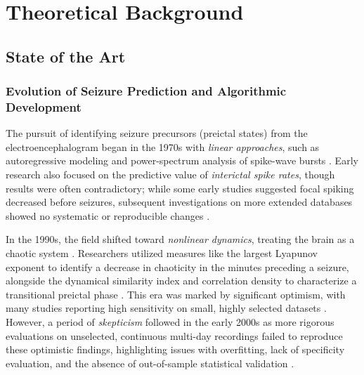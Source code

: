 \chapter{Theoretical Background}\label{ch:theoretical-background}



\section{State of the Art}


\subsection{Evolution of Seizure Prediction and Algorithmic Development}
The pursuit of identifying seizure precursors (preictal states)  from the electroencephalogram began in the 1970s with \textit{linear approaches}, such as autoregressive modeling and power-spectrum analysis of spike-wave bursts \parencite{mormann_seizure_2007}.
Early research also focused on the predictive value of \textit{interictal spike rates}, though results were often contradictory; while some early studies suggested focal spiking decreased before seizures, subsequent investigations on more extended databases showed no systematic or reproducible changes \parencite{mormann_seizure_2007}.

In the 1990s, the field shifted toward \textit{nonlinear dynamics}, treating the brain as a chaotic system \parencite{mormann_seizure_2007, kuhlmann_epilepsyecosystemorg_2018}.
Researchers utilized measures like the largest Lyapunov exponent to identify a decrease in chaoticity in the minutes preceding a seizure, alongside the dynamical similarity index and correlation density to characterize a transitional preictal phase \parencite{mormann_seizure_2007}.
This era was marked by significant optimism, with many studies reporting high sensitivity on small, highly selected datasets \parencite{mormann_seizure_2007, muller_coherent_2022}.
However, a period of \textit{skepticism} followed in the early 2000s as more rigorous evaluations on unselected, continuous multi-day recordings failed to reproduce these optimistic findings, highlighting issues with overfitting, lack of specificity evaluation, and the absence of out-of-sample statistical validation \parencite{mormann_seizure_2007, freestone_forward-looking_2017}.

